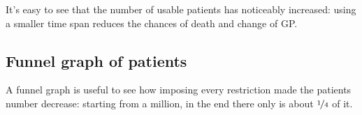 It's easy to see that the number of usable patients has noticeably increased: using a smaller time span reduces the chances of death and change of GP.

\subsection{Funnel graph of patients}
A funnel graph is useful to see how imposing every restriction made the patients number decrease: starting from a million, in the end there only is about $\nicefrac{1}{4}$ of it.







